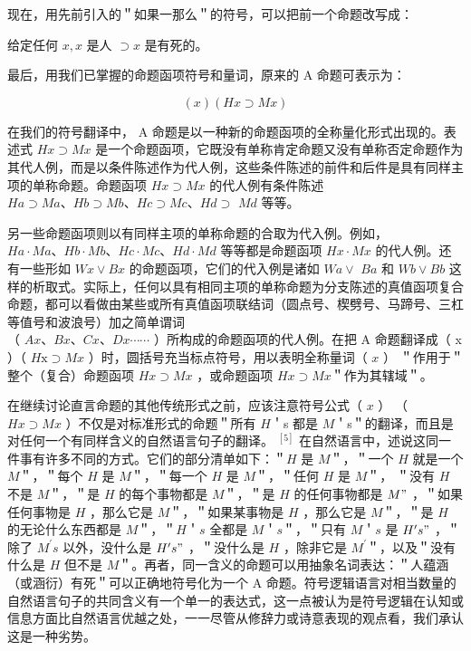 现在，用先前引入的＂如果一那么＂的符号，可以把前一个命题改写成：

给定任何 $x, x$ 是人 $\supset x$ 是有死的。

最后，用我们已掌握的命题函项符号和量词，原来的 A 命题可表示为：

$$
(x)(H x \supset M x)
$$

在我们的符号翻译中， A 命题是以一种新的命题函项的全称量化形式出现的。表述式 $H x \supset M x$ 是一个命题函项，它既没有单称肯定命题又没有单称否定命题作为其代人例，而是以条件陈述作为代人例，这些条件陈述的前件和后件是具有同样主项的单称命题。命题函项 $H x \supset M x$ 的代人例有条件陈述 $H a \supset M a 、 H b \supset M b 、 H c \supset M c 、 H d \supset$ $M d$ 等等。

另一些命题函项则以有同样主项的单称命题的合取为代入例。例如， $H a \cdot M a 、 H b \cdot M b 、 H c \cdot M c 、 H d \cdot M d$ 等等都是命题函项 $H x \cdot M x$ 的代人例。还有一些形如 $W x \vee B x$ 的命题函项，它们的代入例是诸如 $W a \vee$ $B a$ 和 $W b \vee B b$ 这样的析取式。实际上，任何以具有相同主项的单称命题为分支陈述的真值函项复合命题，都可以看做由某些或所有真值函项联结词（圆点号、楔劈号、马蹄号、三杠等值号和波浪号）加之简单谓词\\
（ $A x 、 B x 、 C x 、 D x \cdots \cdots$ ）所构成的命题函项的代人例。在把 A 命题翻译成（ x ）（ $H \mathrm{x} \supset M x$ ）时，圆括号充当标点符号，用以表明全称量词（ $x$ ） ＂作用于＂整个（复合）命题函项 $H x \supset M x$ ，或命题函项 $H x \supset M x$＂作为其辖域＂。

在继续讨论直言命题的其他传统形式之前，应该注意符号公式（ $x$ ） （ $H x \supset M x$ ）不仅是对标准形式的命题＂所有 $H$＇s 都是 $M$＇s＂的翻译，而且是对任何一个有同样含义的自然语言句子的翻译。 ${ }^{[5]}$ 在自然语言中，述说这同一件事有许多不同的方式。它们的部分清单如下：＂$H$ 是 $M$＂，＂一个 $H$ 就是一个 $M$＂，＂每个 $H$ 是 $M$＂，＂每一个 $H$ 是 $M$＂，＂任何 $H$ 是 $M$＂， ＂没有 $H$ 不是 $M$＂，＂是 $H$ 的每个事物都是 $M$＂，＂是 $H$ 的任何事物都是 $M "$ ，＂如果任何事物是 $H$ ，那么它是 $M$＂，＂如果某事物是 $H$ ，那么它是 $M$＂，＂是 $H$ 的无论什么东西都是 $M$＂，＂$H$＇$s$ 全都是 $M$＇$s$＂，＂只有 $M$＇$s$ 是 $H^{\prime} s "$ ，＂除了 $M^{\prime} s$ 以外，没什么是 $H^{\prime} s "$ ，＂没什么是 $H$ ，除非它是 $M^{\prime}$＂，以及＂没有什么是 $H$ 但不是 $M$＂。再者，同一含义的命题可以用抽象名词表达：＂人蕴涵（或涵衍）有死＂可以正确地符号化为一个 A 命题。符号逻辑语言对相当数量的自然语言句子的共同含义有一个单一的表达式，这一点被认为是符号逻辑在认知或信息方面比自然语言优越之处，一一尽管从修辞力或诗意表现的观点看，我们承认这是一种劣势。 

